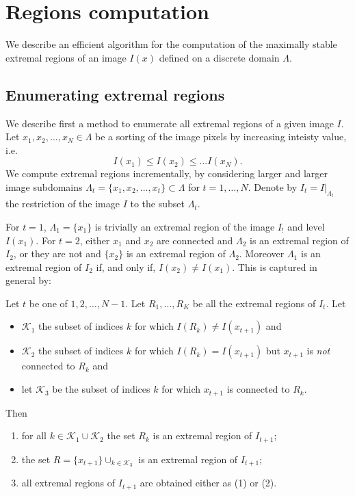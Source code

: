 \documentclass{article}
\begin{document}
\section{Regions computation}\label{sect:comp}

We describe an efficient algorithm for the computation of the maximally stable extremal regions of an image $I(x)$ defined on a discrete domain $\Lambda$. 

\subsection{Enumerating extremal regions}

We describe first a method to enumerate all extremal regions of a given image $I$. Let $x_1,x_2,\ldots,x_N \in \Lambda$ be a sorting of the image pixels by increasing inteisty value, i.e.
\[ I(x_1) \leq I(x_2) \leq \dots I(x_N). \]
We compute extremal regions incrementally, by considering larger and larger image subdomains $\Lambda_t = \{x_1,x_2,\dots,x_t\}\subset \Lambda$ for $t=1,\dots,N$. Denote by $I_t = I|_{\Lambda_t}$ the restriction of the image $I$ to the subset $\Lambda_t$.

For $t=1$, $\Lambda_1 = \{x_1\}$ is trivially an extremal region of the image $I_!$ and level $I(x_1)$. For $t=2$, either $x_1$ and $x_2$ are connected and $\Lambda_2$ is an extremal region of $I_2$, or they are not and $\{x_2\}$ is an extremal region of $\Lambda_2$. Moreover $\Lambda_1$ is an extremal region of $I_2$ if, and only if, $I(x_2)\not=I(x_1)$. This is captured in general by:

\begin{lemma}\label{lemma:er-fund} 
Let $t$ be one of $1,2,\dots,N-1$. Let $R_1,\ldots,R_K$ be all the extremal regions of $I_t$. Let
\begin{itemize}
\item
$\mathcal{K}_1$ the subset of indices $k$ for which $I(R_k) \not= I(x_{t+1})$ and 
\item
$\mathcal{K}_2$ the subset of indices $k$ for which $I(R_k) = I(x_{t+1})$ but $x_{t+1}$ is {\em not} connected to $R_k$ and
\item
let $\mathcal{K}_3$ be the subset of indices $k$ for which $x_{t+1}$ is connected to $R_k$. 
\end{itemize}
Then
	\begin{enumerate}
		\item for all $k\in\mathcal{K}_1 \cup \mathcal{K}_2$ the set $R_k$ is an extremal region of $I_{t+1}$;
		
		\item the set $R = \{x_{t+1}\} \cup_{k \in\mathcal{K}_3}$ is an extremal region of $I_{t+1}$;
		
		\item all extremal regions of $I_{t+1}$ are obtained either as (1) or (2). 
	\end{enumerate}
\end{lemma}
\end{document}
